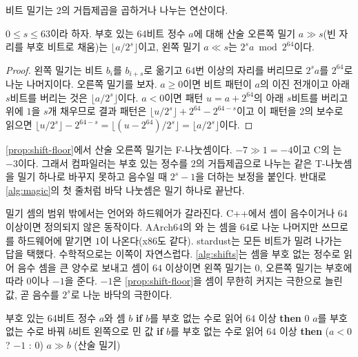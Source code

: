 비트 밀기는 $2$의 거듭제곱을 곱하거나 나누는 연산이다.

\begin{proposition}
\label{prop:shift-floor}
$0\le s\le63$이라 하자. 부호 있는 64비트 정수 $a$에 대해 산술 오른쪽 밀기 $a\gg s$(빈 자리를 부호 비트로 채움)는 $\lfloor a/2^s\rfloor$이고, 왼쪽 밀기 $a\ll s$는 $2^sa\bmod2^{64}$이다.
\end{proposition}

\begin{proof}
왼쪽 밀기는 비트 $b_i$를 $b_{i+s}$로 옮기고 $64$번 이상의 자리를 버리므로 $2^sa$를 $2^{64}$로 나눈 나머지이다. 오른쪽 밀기를 보자. $a\ge0$이면 비트 패턴이 $a$의 이진 전개이고 아래 $s$비트를 버리는 것은 $\lfloor a/2^s\rfloor$이다. $a<0$이면 패턴 $u=a+2^{64}$의 아래 $s$비트를 버리고 위에 $1$을 $s$개 채우므로 결과 패턴은 $\lfloor u/2^s\rfloor+2^{64}-2^{64-s}$이고 이 패턴을 2의 보수로 읽으면 $\lfloor u/2^s\rfloor-2^{64-s}=\lfloor(u-2^{64})/2^s\rfloor=\lfloor a/2^s\rfloor$이다.
\end{proof}

\cref{prop:shift-floor}에서 산술 오른쪽 밀기는 F-나눗셈이다. $-7\gg1=-4$이고 C의 는 $-3$이다. 그래서 컴파일러는 부호 있는 정수를 $2$의 거듭제곱으로 나누는  같은 T-나눗셈을 밀기 하나로 바꾸지 못하고 음수일 때 $2^s-1$을 더하는 보정을 붙인다. 반대로 \cref{alg:magic}의 첫 줄처럼 바닥 나눗셈은 밀기 하나로 끝난다.

밀기 셈의 범위 밖에서는 언어와 하드웨어가 갈라진다. C++에서 셈이 음수이거나 $64$ 이상이면 정의되지 않은 동작이다. AArch64의 와 는 셈을 $64$로 나눈 나머지만 쓰므로 를 하드웨어에 맡기면 $1$이 나온다(x86도 같다). stardust는 모든 비트가 밀려 나가는 답을 택했다. 수학적으로는 이쪽이 자연스럽다. \cref{alg:shifts}는 셈을 부호 없는 정수로 읽어 음수 셈을 큰 양수로 보내고 셈이 $64$ 이상이면 왼쪽 밀기는 $0$, 오른쪽 밀기는 부호에 따라 $0$이나 $-1$을 준다. $-1$은 \cref{prop:shift-floor}을 셈이 무한히 커지는 극한으로 늘린 값, 곧 음수를 $2^s$로 나눈 바닥의 극한이다.

\begin{algorithm}[htbp]
\begin{algorithmic}[1]
\Require 부호 있는 64비트 정수 $a$와 셈 $b$
  \State \textbf{if} $b$를 부호 없는 수로 읽어 $64$ 이상 \textbf{then} \Return $0$ 
  \State \Return $a$를 부호 없는 수로 바꿔 $b$비트 왼쪽으로 민 값 
\EndFunction
{}
  \State \textbf{if} $b$를 부호 없는 수로 읽어 $64$ 이상 \textbf{then} \Return ($a<0$ ? $-1$ : $0$)
  \State \Return $a\gg b$ (산술 밀기) 
\EndFunction
\end{algorithmic}
\caption{밀기 셈의 경계 처리 (stardust , )}
\label{alg:shifts}
\end{algorithm}

